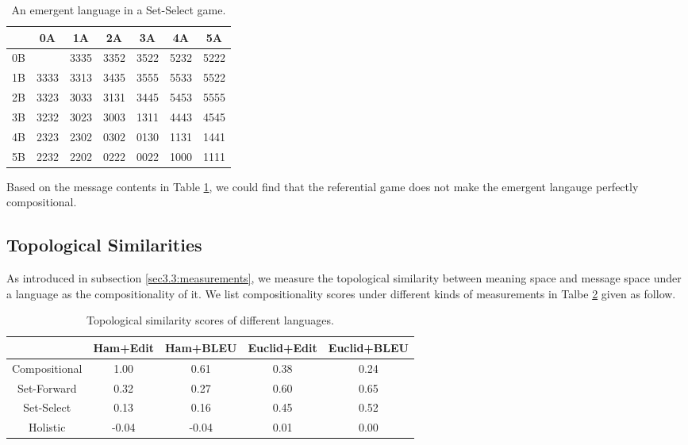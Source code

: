 \begin{table}[!h]
    \centering
    \begin{tabular}{|c|c|c|c|c|c|c|}
        \hline
           & 0A   & 1A   & 2A   & 3A   & 4A   & 5A   \\ \hline
        0B &      & 3335 & 3352 & 3522 & 5232 & 5222 \\ \hline
        1B & 3333 & 3313 & 3435 & 3555 & 5533 & 5522 \\ \hline
        2B & 3323 & 3033 & 3131 & 3445 & 5453 & 5555 \\ \hline
        3B & 3232 & 3023 & 3003 & 1311 & 4443 & 4545 \\ \hline
        4B & 2323 & 2302 & 0302 & 0130 & 1131 & 1441 \\ \hline
        5B & 2232 & 2202 & 0222 & 0022 & 1000 & 1111 \\ \hline
        \end{tabular}
    \caption{An emergent language in a Set-Select game.}
    \label{tab4.3:emregent_langauge_referential}
\end{table}

Based on the message contents in Table \ref{tab4.3:emregent_langauge_referential}, we could find that the referential game does not make the emergent langauge perfectly compositional.

\subsection{Topological Similarities}
\label{ssec4.2.2:topo_sim}

As introduced in subsection \ref{sec3.3:measurements}, we measure the topological similarity between meaning space and message space under a language as the compositionality of it. We list compositionality scores under different kinds of measurements in Talbe \ref{tab4.4:topo_sim_lans} given as follow.

\begin{table}[!h]
    \begin{tabular}{|c|c|c|c|c|}
        \hline
                      & Ham+Edit & Ham+BLEU & Euclid+Edit & Euclid+BLEU \\ \hline
        Compositional & 1.00     & 0.61     & 0.38        & 0.24        \\ \hline
        Set-Forward   & 0.32     & 0.27     & 0.60        & 0.65        \\ \hline
        Set-Select    & 0.13     & 0.16     & 0.45        & 0.52        \\ \hline
        Holistic      & -0.04    & -0.04    & 0.01        & 0.00        \\ \hline
    \end{tabular}
    \caption{Topological similarity scores of different languages.}
    \label{tab4.4:topo_sim_lans}
\end{table}

